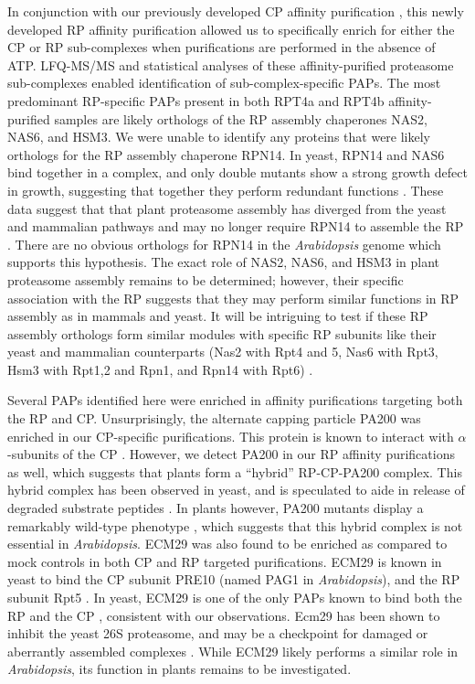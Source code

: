 	In conjunction with our previously developed CP affinity purification \citep{book10}, this newly developed RP affinity purification allowed us to specifically enrich for either the CP or RP sub-complexes when purifications are performed in the absence of ATP. LFQ-MS/MS and statistical analyses of these affinity-purified proteasome sub-complexes enabled identification of sub-complex-specific PAPs. The most predominant RP-specific PAPs present in both RPT4a and RPT4b affinity-purified samples are likely orthologs of the RP assembly chaperones NAS2, NAS6, and HSM3. We were unable to identify any proteins that were likely orthologs for the RP assembly chaperone RPN14. In yeast, RPN14 and NAS6 bind together in a complex, and only double mutants show a strong growth defect in growth, suggesting that together they perform redundant functions \citep{funakoshi09}. These data suggest that that plant proteasome assembly has diverged from the yeast and mammalian pathways and may no longer require RPN14 to assemble the RP \citep{funakoshi09}. There are no obvious orthologs for RPN14 in the \textit{Arabidopsis} genome \citep{book10} which supports this hypothesis. The exact role of NAS2, NAS6, and HSM3 in plant proteasome assembly remains to be determined; however, their specific association with the RP suggests that they may perform similar functions in RP assembly as in mammals and yeast. It will be intriguing to test if these RP assembly orthologs form similar modules with specific RP subunits like their yeast and mammalian counterparts (Nas2 with Rpt4 and 5, Nas6 with Rpt3, Hsm3 with Rpt1,2 and Rpn1, and Rpn14 with Rpt6) \citep{park10}. 
	  
Several PAPs identified here were enriched in affinity purifications targeting both the RP and CP. Unsurprisingly, the alternate capping particle PA200 was enriched in our CP-specific purifications. This protein is known to interact with $\alpha$-subunits of the CP \citep{ortega05}. However, we detect PA200 in our RP affinity purifications as well, which suggests that plants form a “hybrid” RP-CP-PA200 complex. This hybrid complex has been observed in yeast, and is speculated to aide in release of degraded substrate peptides \citep{ortega05, schmidt05, ustrell02}. In plants however, PA200 mutants display a remarkably wild-type phenotype \citep{book10}, which suggests that this hybrid complex is not essential in \textit{Arabidopsis}. ECM29 was also found to be enriched as compared to mock controls in both CP and RP targeted purifications. ECM29 is known in yeast to bind the CP subunit PRE10 (named PAG1 in \textit{Arabidopsis}), and the RP subunit Rpt5 \citep{wani16}. In yeast, ECM29 is one of the only PAPs known to bind both the RP and the CP \citep{lehmann10}, consistent with our observations. Ecm29 has been shown to inhibit the yeast 26S proteasome, and may be a checkpoint for damaged or aberrantly assembled complexes \citep{lehmann10}. While ECM29 likely performs a similar role in \textit{Arabidopsis}, its function in plants remains to be investigated.

